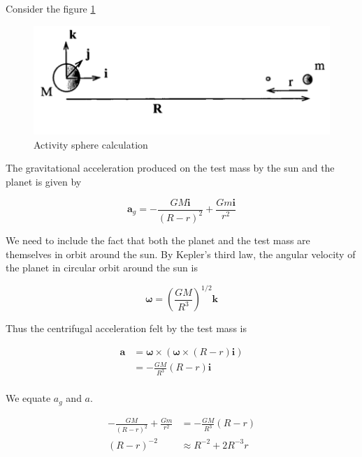 \documentclass{article}
\theoremstyle{definition}
\begin{document}
Consider the figure \ref{fig: activity sphere }

\begin{figure}[h]
    \centering
    \includegraphics[scale=0.3]{image 16.png}
    \caption{Activity sphere calculation}
    \label{fig: activity sphere }
\end{figure}

The gravitational acceleration produced on the test mass by the sun and the planet is given by

\begin{equation}
    \boldsymbol{a}_g = - \frac{G M \boldsymbol{i}}{(R-r)^2} + \frac{G m \boldsymbol{i}}{r^2}
\end{equation}

We need to include the fact that both the planet and the test mass are themselves in orbit around the sun. 
By Kepler's third law, the angular velocity of the planet in circular orbit around the sun is

\begin{equation}
    \boldsymbol{\omega} =  \left( \frac{G M}{R^3} \right)^{1/2} \boldsymbol{k}
\end{equation}

Thus the centrifugal acceleration felt by the test mass is 

\begin{equation}
    \begin{split}
        \boldsymbol{a} & = \boldsymbol{\omega} \times (\boldsymbol{\omega} \times (R - r) \boldsymbol{i}) \\
        & = -\frac{G M}{R^3} (R - r) \boldsymbol{i}\\
    \end{split}
\end{equation}

We equate $a_g$ and $a$.

\begin{equation}
\begin{split}
    - \frac{G M }{(R-r)^2} + \frac{G m}{r^2} & = -\frac{G M}{R^3} (R - r) \\
     (R - r)^{-2} & \approx R^{-2} + 2 R^{-3} r \\
\end{split}   
\end{equation}
\end{document}
